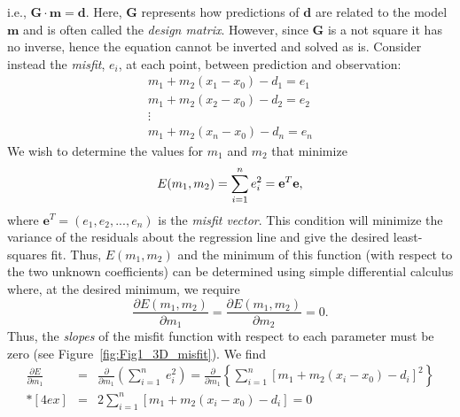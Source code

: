 i.e., $\mathbf{G \cdot m = d}$.  Here, $\mathbf{G}$ represents how predictions of $\mathbf{d}$ are related to the model $\mathbf{m}$ and is often
called the \emph{design matrix}.
However, since $\mathbf{G}$ is a not square it has no inverse, hence the equation cannot be inverted and solved as is. 
Consider instead the \emph{misfit}, $e_i$, at each point, between prediction and observation:
\begin{equation}
\begin{array}{c}
m_1 + m_2 (x_1 - x_0) - d_1 = e_1\\
m_1 + m_2 (x_2 - x_0) - d_2 = e_2\\
\vdots\\
m_1 + m_2(x_n - x_0) - d_n = e_n
\end{array}
\end{equation}
We wish to determine the values for $m_1$ and $m_2$ that minimize
\begin{equation}
	\index{Misfit function}
E(m_1, m_2) = \sum^n_{i=1} e^2_i = {\mathbf e}^T{\mathbf e},
\end{equation}
where $\mathbf{e}^T = (e_1, e_2, ..., e_n)$ is the \emph{misfit vector}.       
This condition will minimize the variance of the residuals about the regression line and give the desired least-squares fit.
Thus, $E(m_1 ,m_2)$ and the minimum of this function (with respect to the two unknown coefficients) 
can be determined using simple differential calculus where, at the desired minimum, we require
\begin{equation}
\frac{\partial E(m_1,m_2)}{\partial m_1} = \frac{\partial E (m_1, m_2)}{\partial m_2} = 0.
\end{equation}
Thus, the \emph{slopes} of the misfit function with respect to each parameter must be zero (see Figure~\ref{fig:Fig1_3D_misfit}).  We find
\begin{equation}
\begin{array}{rcl}
\displaystyle
\frac{\partial E}{\partial m_1} & = & \displaystyle \frac{\partial}{\partial m_1} \left ( \sum^n_{i=1} \ e^2_i \right ) = \frac{\partial}{\partial m_1} \left \{ \sum^n_{i=1} \left [ m_1 + m_2 (x_i - x_0) - d_i \right ] ^2 \right \}\\*[4ex]
 &  = & \displaystyle 2 \sum^n_{i=1} \left [ m_1 + m_2 (x_i - x_0) - d_i \right ] = 0
\end{array}
\end{equation}
